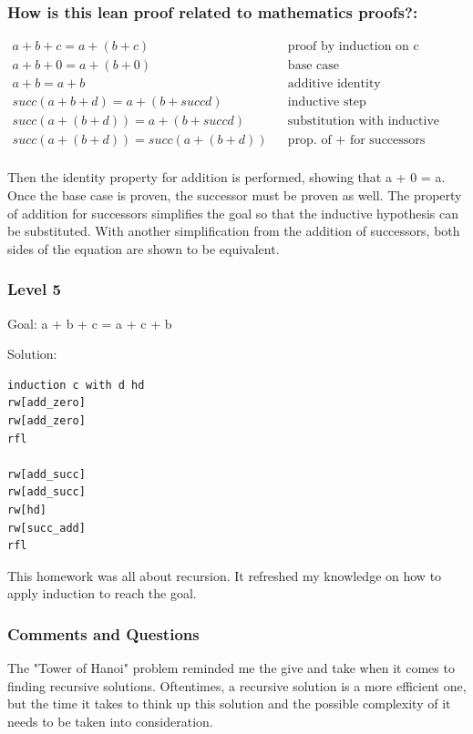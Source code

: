 \documentclass{article}
\theoremstyle{theorem}
\theoremstyle{definition}
\theoremstyle{remark}
\begin{document}
\subsubsection*{How is this lean proof related to mathematics proofs?:}
\begin{align}
  a + b + c = a + (b+c)   &      &\text{proof by induction on c} \\
  a + b + 0 = a + (b+0)   &      &\text{base case} \\
  a + b = a + b        &      &\text{additive identity} \\
  succ(a + b + d) = a + (b+succd)&    &\text{inductive step} \\
  succ(a + (b + d)) = a + (b+succd)&      &\text{substitution with inductive hypothesis} \\
  succ(a + (b + d)) = succ(a + (b+d))&      &\text{prop. of + for successors} \\
\end{align}


Then the identity property for addition is performed, showing that a + 0 = a.
Once the base case is proven, the successor must be proven as well.
The property of addition for successors simplifies the goal so that the inductive hypothesis can 
be substituted. With another simplification from the addition of successors, both sides of the equation
are shown to be equivalent.
\subsubsection*{Level 5}
Goal: a + b + c = a + c + b

Solution:
\begin{lstlisting}
induction c with d hd
rw[add_zero]
rw[add_zero]
rfl

rw[add_succ]
rw[add_succ]
rw[hd]
rw[succ_add]
rfl
\end{lstlisting}
This homework was all about recursion. It refreshed my knowledge on how to apply induction
to reach the goal.

\subsubsection*{Comments and Questions}
The "Tower of Hanoi" problem reminded me the give and take when it comes to finding 
recursive solutions. Oftentimes, a recursive solution is a more efficient one, but the time
it takes to think up this solution and the possible complexity of it needs to be taken into consideration.
\end{document}
